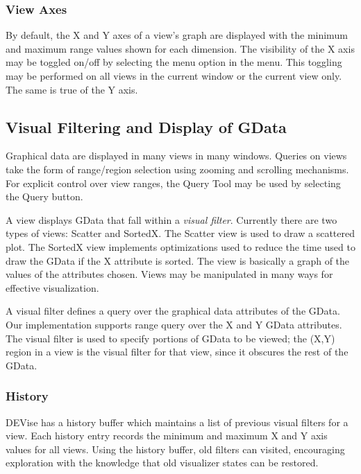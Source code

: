\subsubsection{View Axes}

By default, the X and Y axes of a view's graph are displayed with the minimum
and maximum range values shown for each dimension. The visibility of the X axis
may be toggled on/off by selecting the  menu option in the
 menu. This toggling may be performed on all views in the current
window or the current view only. The same is true of the Y axis.

\subsection{Visual Filtering and Display of GData}

Graphical data are displayed in many views in many windows. Queries on views
take the form of range/region selection using zooming and scrolling
mechanisms. For explicit control over view ranges, the Query Tool may be used
by selecting the Query button.

A view displays GData that fall within a {\em visual filter}. Currently there
are two types of views: Scatter and SortedX. The Scatter view is used to draw a
scattered plot. The SortedX view implements optimizations used to reduce the
time used to draw the GData if the X attribute is sorted. The view is basically
a graph of the values of the attributes chosen. Views may be manipulated in many
ways for effective visualization.

A visual filter defines a query over the graphical data attributes of the
GData. Our implementation supports range query over the X and Y GData
attributes. The visual filter is used to specify portions of GData to be viewed;
the (X,Y) region in a view is the visual filter for that view, since it obscures
the rest of the GData.

\subsubsection{History}

DEVise has a history buffer which maintains a list of previous visual filters
for a view. Each history entry records the minimum and maximum X and Y axis
values for all views. Using the history buffer, old filters can visited,
encouraging exploration with the knowledge that old visualizer states can be
restored.

